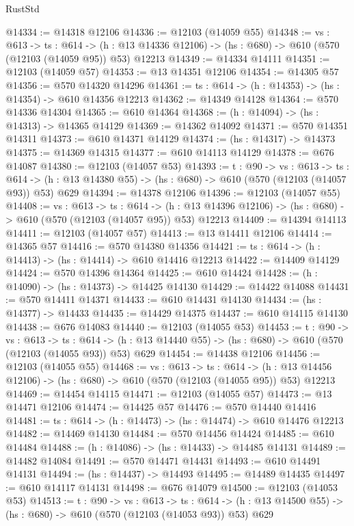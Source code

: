 \begin{lexlean}{RustStd}
\begin{coremodule}
@14334 := @14318 @12106
@14336 := @12103 (@14059 @55)
@14348 := {vs : @613} ->
  {ts : @614} ->
  (h : @13 @14336 @12106) -> (hs : @680) -> @610 (@570 (@12103 (@14059 @95)) @53) @12213
@14349 := @14334 @14111
@14351 := @12103 (@14059 @57)
@14353 := @13 @14351 @12106
@14354 := @14305 @57
@14356 := @570 @14320 @14296
@14361 := {ts : @614} -> (h : @14353) -> (hs : @14354) -> @610 @14356 @12213
@14362 := @14349 @14128
@14364 := @570 @14336 @14304
@14365 := @610 @14364
@14368 := (h : @14094) -> (hs : @14313) -> @14365 @14129
@14369 := @14362 @14092
@14371 := @570 @14351 @14311
@14373 := @610 @14371 @14129
@14374 := (hs : @14317) -> @14373
@14375 := @14369 @14315
@14377 := @610 @14113 @14129
@14378 := @676 @14087
@14380 := @12103 (@14057 @53)
@14393 := {t : @90} ->
  {vs : @613} ->
  {ts : @614} -> (h : @13 @14380 @55) -> (hs : @680) -> @610 (@570 (@12103 (@14057 @93)) @53) @629
@14394 := @14378 @12106
@14396 := @12103 (@14057 @55)
@14408 := {vs : @613} ->
  {ts : @614} ->
  (h : @13 @14396 @12106) -> (hs : @680) -> @610 (@570 (@12103 (@14057 @95)) @53) @12213
@14409 := @14394 @14113
@14411 := @12103 (@14057 @57)
@14413 := @13 @14411 @12106
@14414 := @14365 @57
@14416 := @570 @14380 @14356
@14421 := {ts : @614} -> (h : @14413) -> (hs : @14414) -> @610 @14416 @12213
@14422 := @14409 @14129
@14424 := @570 @14396 @14364
@14425 := @610 @14424
@14428 := (h : @14090) -> (hs : @14373) -> @14425 @14130
@14429 := @14422 @14088
@14431 := @570 @14411 @14371
@14433 := @610 @14431 @14130
@14434 := (hs : @14377) -> @14433
@14435 := @14429 @14375
@14437 := @610 @14115 @14130
@14438 := @676 @14083
@14440 := @12103 (@14055 @53)
@14453 := {t : @90} ->
  {vs : @613} ->
  {ts : @614} -> (h : @13 @14440 @55) -> (hs : @680) -> @610 (@570 (@12103 (@14055 @93)) @53) @629
@14454 := @14438 @12106
@14456 := @12103 (@14055 @55)
@14468 := {vs : @613} ->
  {ts : @614} ->
  (h : @13 @14456 @12106) -> (hs : @680) -> @610 (@570 (@12103 (@14055 @95)) @53) @12213
@14469 := @14454 @14115
@14471 := @12103 (@14055 @57)
@14473 := @13 @14471 @12106
@14474 := @14425 @57
@14476 := @570 @14440 @14416
@14481 := {ts : @614} -> (h : @14473) -> (hs : @14474) -> @610 @14476 @12213
@14482 := @14469 @14130
@14484 := @570 @14456 @14424
@14485 := @610 @14484
@14488 := (h : @14086) -> (hs : @14433) -> @14485 @14131
@14489 := @14482 @14084
@14491 := @570 @14471 @14431
@14493 := @610 @14491 @14131
@14494 := (hs : @14437) -> @14493
@14495 := @14489 @14435
@14497 := @610 @14117 @14131
@14498 := @676 @14079
@14500 := @12103 (@14053 @53)
@14513 := {t : @90} ->
  {vs : @613} ->
  {ts : @614} -> (h : @13 @14500 @55) -> (hs : @680) -> @610 (@570 (@12103 (@14053 @93)) @53) @629

\end{coremodule}
\end{lexlean}
